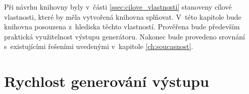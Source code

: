 
Při návrhu knihovny byly v~části \ref{ssec:cilove_vlastnosti} stanoveny cílové vlastnosti, které by měla vytvořená knihovna splňovat.
V~této kapitole bude knihovna posouzena z~hlediska těchto vlastností.
Prověřena bude především praktická využitelnost výstupu generátoru.
Nakonec bude provedeno srovnání s~existujícími řešeními uvedenými v~kapitole \ref{ch:soucasnost}.


\section{Rychlost generování výstupu}


